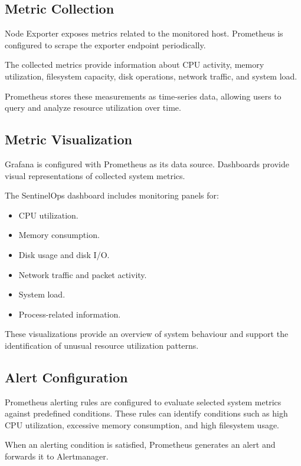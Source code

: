 \documentclass[conference]{IEEEtran}
\begin{document}
\subsection{Metric Collection}

Node Exporter exposes metrics related to the monitored host.
Prometheus is configured to scrape the exporter endpoint
periodically.

The collected metrics provide information about CPU activity,
memory utilization, filesystem capacity, disk operations,
network traffic, and system load.

Prometheus stores these measurements as time-series data,
allowing users to query and analyze resource utilization
over time.

\subsection{Metric Visualization}

Grafana is configured with Prometheus as its data source.
Dashboards provide visual representations of collected
system metrics.

The SentinelOps dashboard includes monitoring panels for:

\begin{itemize}
    \item CPU utilization.
    \item Memory consumption.
    \item Disk usage and disk I/O.
    \item Network traffic and packet activity.
    \item System load.
    \item Process-related information.
\end{itemize}

These visualizations provide an overview of system behaviour
and support the identification of unusual resource utilization
patterns.

\subsection{Alert Configuration}

Prometheus alerting rules are configured to evaluate
selected system metrics against predefined conditions.
These rules can identify conditions such as high CPU
utilization, excessive memory consumption, and high
filesystem usage.

When an alerting condition is satisfied, Prometheus
generates an alert and forwards it to Alertmanager.
\end{document}

